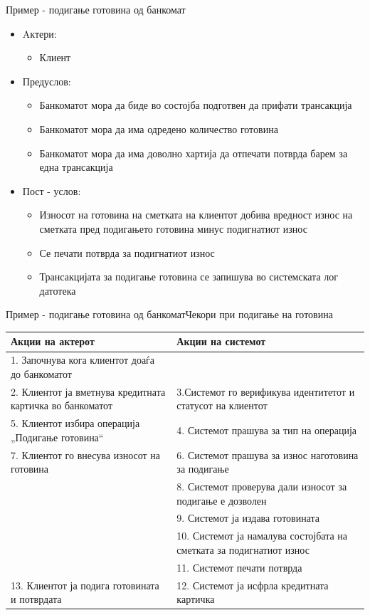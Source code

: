 \begin{frame}[shrink=10]{Пример - подигање готовина од банкомат}
\begin{itemize}
  \item Aктери:
    \begin{itemize}
        \item Клиент
    \end{itemize}  
  \item Предуслов:
    \begin{itemize}
        \item Банкоматот мора да биде во состојба подготвен да прифати
        трансакција
        \item Банкоматот мора да има одредено количество готовина
        \item Банкоматот мора да има доволно хартија да отпечати потврда барем за една трансакција
    \end{itemize}  
  \item Пост - услов:
    \begin{itemize}
        \item Износот на готовина на сметката на клиентот добива вредност износ на сметката пред подигањето готовина минус подигнатиот износ
        \item Се печати потврда за подигнатиот износ
        \item Трансакцијата за подигање готовина се запишува во системската лог
        датотека
    \end{itemize}  
\end{itemize}  
\end{frame}

\begin{frame}{Пример - подигање готовина од банкомат}{Чекори при подигање на
готовина}
\begin{scriptsize}
\begin{tabular}{p{} | p{}}
\textbf{Акции на актерот} & \textbf{Акции на системот}\\
\hline
1. Започнува кога клиентот доаѓа до банкоматот & \\
\hline
2. Клиентот ја вметнува кредитната картичка во банкоматот & 3.Системот го
верификува идентитетот и статусот на клиентот \\
\hline
5. Клиентот избира операција  „Подигање готовина“ & 4. Системот прашува за тип
на операција \\
\hline
7. Клиентот го внесува износот на готовина & 6. Системот прашува за износ
наготовина за подигање\\
\hline
& 8. Системот проверува дали износот за подигање е дозволен\\
\hline
& 9. Системот ја издава готовината\\
\hline
& 10. Системот ја намалува состојбата на сметката за подигнатиот износ\\
\hline
& 11. Системот печати потврда\\
\hline
13. Клиентот ја подига готовината и потврдата & 12. Системот ја исфрла
кредитната картичка \\
\end{tabular}
\end{scriptsize}
\end{frame}


